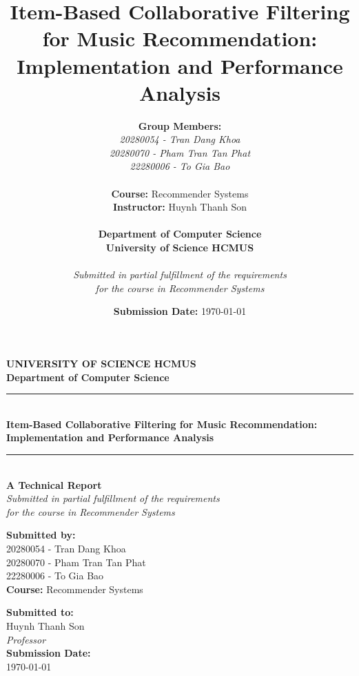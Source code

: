 \documentclass[12pt,a4paper]{article}
\title{\textbf{Item-Based Collaborative Filtering for Music Recommendation: Implementation and Performance Analysis}}
\author{
    \textbf{Group Members:} \\
    \textit{20280054 - Tran Dang Khoa} \\
    \textit{20280070 - Pham Tran Tan Phat} \\
    \textit{22280006 - To Gia Bao} \\
    \vspace{0.5cm} \\
    \textbf{Course:} Recommender Systems \\
    \textbf{Instructor:} Huynh Thanh Son \\
    \vspace{0.5cm} \\
    \textbf{Department of Computer Science} \\
    \textbf{University of Science HCMUS} \\
    \vspace{0.5cm} \\
    \textit{Submitted in partial fulfillment of the requirements} \\
    \textit{for the course in Recommender Systems}
}
\date{\textbf{Submission Date:} \today}
\begin{document}
\begin{titlepage}
    \centering
    \vspace*{2cm}
    
    
    \textbf{\Large UNIVERSITY OF SCIENCE HCMUS} \\
    \textbf{\large Department of Computer Science} \\
    \vspace{1.5cm}
    
    \rule{\linewidth}{0.5mm} \\[0.4cm]
    {\huge \bfseries Item-Based Collaborative Filtering for Music Recommendation: Implementation and Performance Analysis} \\[0.4cm]
    \rule{\linewidth}{0.5mm} \\[1.5cm]
    
    \textbf{\Large A Technical Report} \\
    \vspace{0.5cm}
    \textit{Submitted in partial fulfillment of the requirements \\
    for the course in Recommender Systems} \\
    \vspace{2cm}
    
    \begin{minipage}{0.4\textwidth}
        \begin{flushleft} \large
            \textbf{Submitted by:} \\
            20280054 - Tran Dang Khoa \\
            20280070 - Pham Tran Tan Phat \\
            22280006 - To Gia Bao \\
            \vspace{0.5cm}
            \textbf{Course:} Recommender Systems \\
        \end{flushleft}
    \end{minipage}
    \hfill
    \begin{minipage}{0.4\textwidth}
        \begin{flushright} \large
            \textbf{Submitted to:} \\
            Huynh Thanh Son \\
            \textit{Professor} \\
            \vspace{0.5cm}
            \textbf{Submission Date:} \\
            \today \\
        \end{flushright}
    \end{minipage}
    

\end{titlepage}
\end{document}
